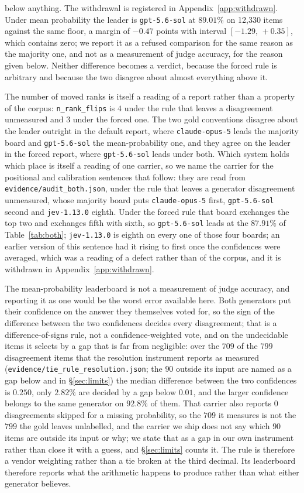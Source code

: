 \documentclass{article}
\newcommand{\ids}[1]{\texttt{\small #1}} %
\begin{document}
below anything. The withdrawal is registered in Appendix~\ref{app:withdrawn}. Under mean probability the leader is \ids{gpt-5.6-sol} at $89.01\%$ on 12,330 items against the same floor, a margin of $-0.47$ points with interval $[-1.29,\,+0.35]$, which contains zero; we report it as a refused comparison for the same reason as the majority one, and not as a measurement of judge accuracy, for the reason given below. Neither difference becomes a verdict, because the forced rule is arbitrary and because the two disagree about almost everything above it.

The number of moved ranks is itself a reading of a report rather than a property of the corpus: \texttt{n\_rank\_flips} is $4$ under the rule that leaves a disagreement unmeasured and $3$ under the forced one. The two gold conventions disagree about the leader outright in the default report, where \ids{claude-opus-5} leads the majority board and \ids{gpt-5.6-sol} the mean-probability one, and they agree on the leader in the forced report, where \ids{gpt-5.6-sol} leads under both. Which system holds which place is itself a reading of one carrier, so we name the carrier for the positional and calibration sentences that follow: they are read from \ids{evidence/audit\_both.json}, under the rule that leaves a generator disagreement unmeasured, whose majority board puts \ids{claude-opus-5} first, \ids{gpt-5.6-sol} second and \ids{jev-1.13.0} eighth. Under the forced rule that board exchanges the top two and exchanges fifth with sixth, so \ids{gpt-5.6-sol} leads at the $87.91\%$ of Table~\ref{tab:both}; \ids{jev-1.13.0} is eighth on every one of those four boards; an earlier version of this sentence had it rising to first once the confidences were averaged, which was a reading of a defect rather than of the corpus, and it is withdrawn in Appendix~\ref{app:withdrawn}.

The mean-probability leaderboard is not a measurement of judge accuracy, and reporting it as one would be the worst error available here. Both generators put their confidence on the answer they themselves voted for, so the sign of the difference between the two confidences decides every disagreement; that is a difference-of-signs rule, not a confidence-weighted vote, and on the undecidable items it selects by a gap that is far from negligible: over the $709$ of the $799$ disagreement items that the resolution instrument reports as measured (\ids{evidence/tie\_rule\_resolution.json}; the $90$ outside its input are named as a gap below and in \S\ref{sec:limits}) the median difference between the two confidences is $0.250$, only $2.82\%$ are decided by a gap below $0.01$, and the larger confidence belongs to the same generator on $92.8\%$ of them. That carrier also reports $0$ disagreements skipped for a missing probability, so the $709$ it measures is not the $799$ the gold leaves unlabelled, and the carrier we ship does not say which $90$ items are outside its input or why; we state that as a gap in our own instrument rather than close it with a guess, and \S\ref{sec:limits} counts it. The rule is therefore a vendor weighting rather than a tie broken at the third decimal. Its leaderboard therefore reports what the arithmetic happens to produce rather than what either generator believes.
\end{document}
